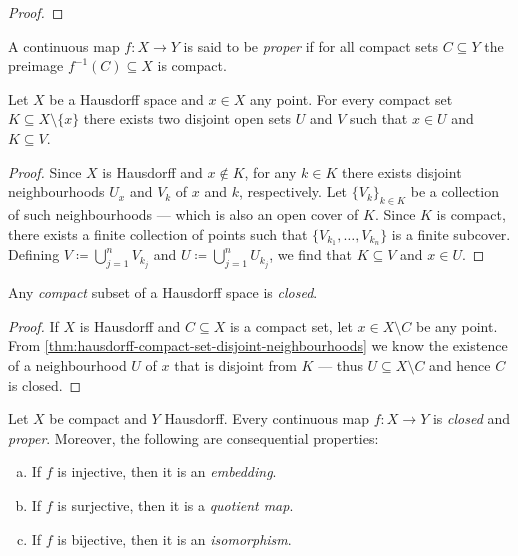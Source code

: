 \begin{proof}
\end{proof}

\begin{definition}
\label{def:proper-Top}
A continuous map \(f: X \to Y\) is said to be \emph{proper} if for all compact
sets \(C \subseteq Y\) the preimage \(f^{-1}(C) \subseteq X\) is compact.
\end{definition}

\begin{theorem}
\label{thm:hausdorff-compact-set-disjoint-neighbourhoods}
Let \(X\) be a Hausdorff space and \(x \in X\) any point. For every compact set
\(K \subseteq X \setminus \{x\}\) there exists two disjoint open sets \(U\) and
\(V\) such that \(x \in U\) and \(K \subseteq V\).
\end{theorem}

\begin{proof}
Since \(X\) is Hausdorff and \(x \notin K\), for any \(k \in K\) there exists
disjoint neighbourhoods \(U_x\) and \(V_k\) of \(x\) and \(k\),
respectively. Let \(\{V_{k}\}_{k \in K}\) be a collection of such neighbourhoods
--- which is also an open cover of \(K\). Since \(K\) is compact, there exists a
finite collection of points such that \(\{V_{k_1}, \dots, V_{k_n}\}\) is a
finite subcover. Defining \(V \coloneq \bigcup_{j=1}^n V_{k_j}\) and
\(U \coloneq \bigcup_{j=1}^n U_{k_j}\), we find that \(K \subseteq V\) and
\(x \in U\).
\end{proof}

\begin{corollary}
\label{cor:hausdorff-compact-subset-is-closed}
Any \emph{compact} subset of a Hausdorff space is \emph{closed}.
\end{corollary}

\begin{proof}
If \(X\) is Hausdorff and \(C \subseteq X\) is a compact set, let
\(x \in X \setminus C\) be any point. From
\cref{thm:hausdorff-compact-set-disjoint-neighbourhoods} we know the existence
of a neighbourhood \(U\) of \(x\) that is disjoint from \(K\) --- thus
\(U \subseteq X \setminus C\) and hence \(C\) is closed.
\end{proof}

\begin{corollary}
\label{cor:map-compact-to-hausdorff-is-closed}
Let \(X\) be compact and \(Y\) Hausdorff. Every continuous map \(f: X \to Y\) is
\emph{closed} and \emph{proper}. Moreover, the following are consequential
properties:
\begin{enumerate}[(a)]\setlength\itemsep{0em}
\item If \(f\) is injective, then it is an \emph{embedding}.
\item If \(f\) is surjective, then it is a \emph{quotient map}.
\item If \(f\) is bijective, then it is an \emph{isomorphism}.
\end{enumerate}
\end{corollary}


